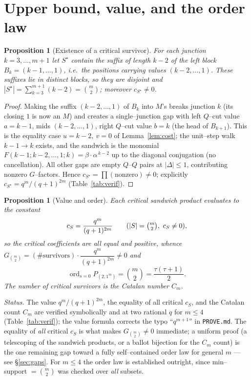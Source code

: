 \documentclass[11pt]{article}
\newtheorem{proposition}[theorem]{Proposition}
\theoremstyle{definition}
\DeclareMathOperator{\ord}{ord}
\begin{document}
\section{Upper bound, value, and the order law}

\begin{proposition}[Existence of a critical survivor]\label{prop:surv}
For each junction $k=3,\dots,m+1$ let $S^\star$ contain the suffix of length $k-2$ of
the \emph{left} block $B_k=(k-1,\dots,1)$, i.e.\ the positions carrying values
$(k-2,\dots,1)$. These suffixes lie in distinct blocks, so they are disjoint and
$|S^\star|=\sum_{k=3}^{m+1}(k-2)=\binom m2$; moreover $c_{S^\star}\ne0$.
\end{proposition}

\begin{proof}
Making the suffix $(k-2,\dots,1)$ of $B_k$ into $M$'s breaks junction $k$ (its closing
$1$ is now an $M$) and creates a single--junction gap with left $Q$--cut value
$a=k-1$, mids $(k-2,\dots,1)$, right $Q$--cut value $b=k$ (the head of $B_{k+1}$). This
is the equality case $u=k-2,\ v=0$ of Lemma~\ref{lem:cost}; the unit--step walk
$k-1\to k$ exists, and the sandwich is the monomial
$F(k-1;k-2,\dots,1;k)=\beta\cdot\alpha^{\,k-2}$ up to the diagonal conjugation
(no cancellation). All other gaps are empty $Q$--$Q$ pairs at $|{\Delta}|\le1$,
contributing nonzero $G$--factors. Hence $c_{S^\star}=\prod(\text{nonzero})\ne0$;
explicitly $c_{S^\star}=q^m/(q+1)^{2m}$ (Table~\ref{tab:verif}).
\end{proof}

\begin{proposition}[Value and order]\label{prop:value}
Each critical sandwich product evaluates to the constant
\[
c_S=\frac{q^{m}}{(q+1)^{2m}}\qquad(|S|=\tbinom m2,\ c_S\ne0),
\]
so the critical coefficients are all equal and positive, whence
$G_{\binom m2}=(\#\text{survivors})\cdot\dfrac{q^m}{(q+1)^{2m}}\ne0$ and
\[
\ord_{s=0}P_{(2,1^m)}=\binom m2=\frac{\tau(\tau+1)}2 .
\]
The number of critical survivors is the Catalan number $C_m$.
\end{proposition}

\noindent\emph{Status.} The value $q^m/(q+1)^{2m}$, the equality of all critical
$c_S$, and the Catalan count $C_m$ are verified symbolically and at two rational
$q$ for $m\le4$ (Table~\ref{tab:verif}); the value formula corrects the typo
``$q^{m+1}$'' in \texttt{PROVE.md}. The equality of \emph{all} critical $c_S$ is what
makes $G_{\binom m2}\ne0$ immediate; a uniform proof (a telescoping of the sandwich
products, or a ballot bijection for the $C_m$ count) is the one remaining gap toward a
fully self--contained order law for general $m$ --- see \S\ref{sec:gaps}. For
$m\le4$ the order law is established outright, since min--support $=\binom m2$ was
checked over \emph{all} subsets.
\end{document}
